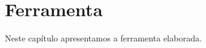 \chapter[Ferramenta]{Ferramenta}
\label{cap:cap3}

Neste capítulo apresentamos a ferramenta elaborada.
